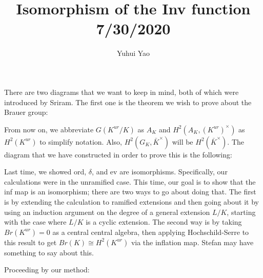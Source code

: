 \documentclass[class=article, crop=false]{standalone}
\begin{document}
\title{Isomorphism of the Inv function 7/30/2020}


\author{Yuhui Yao}
\maketitle
There are two diagrams that we want to keep in mind, both of which were introduced by Sriram. The first one is the theorem we wish to prove about the Brauer group:


\begin{center}
\end{center}


From now on, we abbreviate $G(K^{ur}/K)$ as $A_K$ and $H^2(A_K, (K^{ur})^\times)$ as $H^2(K^{ur})$ to simplify notation. Also, $H^2(G_K, \bar{K}^\times)$ will be $H^2(\bar{K}^\times)$. 
The diagram that we have constructed in order to prove this is the following:


\begin{center}
\end{center}

Last time, we showed ord, $\delta$, and ev are isomorphisms. Specifically, our calculations were in the unramified case. This time, our goal is to show that the inf map is an isomorphism; there are two ways to go about doing that. The first is by extending the calculation to ramified extensions and then going about it by using an induction argument on the degree of a general extension $L/K$, starting with the case where $L/K$ is a cyclic extension. The second way is by taking $Br(K^{ur})=0$ as a central central algebra, then applying Hochschild-Serre to this result to get $Br(K)\cong H^2(K^{ur})$ via the inflation map. Stefan may have something to say about this. 

Proceeding by our method:
\end{document}
